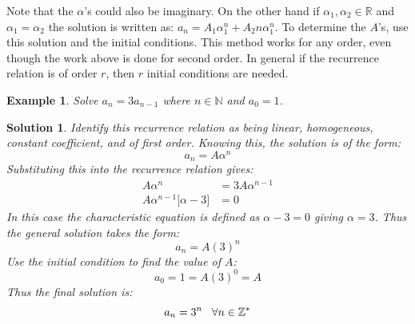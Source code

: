 \documentclass[12pt, letterpaper, onecolumn, conference, final]{IEEEtran}
\theoremstyle{definition}
\theoremstyle{plain}
\newtheorem{example}{Example}[section]
\newtheorem{solution}{Solution}[section]
\begin{document}
\newpage
\noindent
Note that the $\alpha$'s could also be imaginary. On the other hand if $\alpha_1,\alpha_2 \in \mathbb{R}$ and $\alpha_1=\alpha_2$ the solution is written as: $a_n = A_1\alpha_1^n + A_2 n\alpha_1^n$. To determine the $A$'s, use this solution and the initial conditions. This method works for any order, even though the work above is done for second order. In general if the recurrence relation is of order $r$, then $r$ initial conditions are needed.

\begin{example}
Solve $a_n=3a_{n-1}$ where $n \in \mathbb{N}$ and $a_0=1$.
\end{example}
\begin{solution}
Identify this recurrence relation as being linear, homogeneous, constant coefficient, and of first order. Knowing this, the solution is of the form:
\begin{equation*}
a_n = A\alpha^n
\end{equation*}
Substituting this into the recurrence relation gives:
\begin{equation*}
\begin{split}
A\alpha^n &= 3A\alpha^{n-1} \\
A\alpha^{n-1} \Big[ \alpha - 3 \Big] &= 0
\end{split}
\end{equation*}
In this case the characteristic equation is defined as $\alpha-3=0$ giving $\alpha=3$. Thus the general solution takes the form:
\begin{equation*}
a_n = A(3)^n
\end{equation*}
Use the initial condition to find the value of $A$:
\begin{equation*}
a_0 = 1 = A(3)^0 = A
\end{equation*}
Thus the final solution is:
\begin{equation*}
a_n = 3^n \hspace{.3cm} \forall n \in \mathbb{Z}^*
\end{equation*}
\end{solution}
\end{document}
